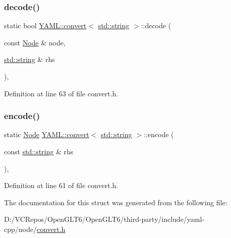 \subsubsection{\texorpdfstring{decode()}{decode()}}
{\footnotesize\ttfamily static bool \mbox{\hyperlink{struct_y_a_m_l_1_1convert}{Y\+A\+M\+L\+::convert}}$<$ \mbox{\hyperlink{glad_8h_ac83513893df92266f79a515488701770}{std\+::string}} $>$\+::decode (\begin{DoxyParamCaption}\item[{const \mbox{\hyperlink{class_y_a_m_l_1_1_node}{Node}} \&}]{node,  }\item[{\mbox{\hyperlink{glad_8h_ac83513893df92266f79a515488701770}{std\+::string}} \&}]{rhs }\end{DoxyParamCaption})\hspace{0.3cm}{\ttfamily [inline]}, {\ttfamily [static]}}



Definition at line 63 of file convert.\+h.

\mbox{\label{struct_y_a_m_l_1_1convert_3_01std_1_1string_01_4_aa0d976f9df2bb843d7ac7bcda30ac4c3}} 
\subsubsection{\texorpdfstring{encode()}{encode()}}
{\footnotesize\ttfamily static \mbox{\hyperlink{class_y_a_m_l_1_1_node}{Node}} \mbox{\hyperlink{struct_y_a_m_l_1_1convert}{Y\+A\+M\+L\+::convert}}$<$ \mbox{\hyperlink{glad_8h_ac83513893df92266f79a515488701770}{std\+::string}} $>$\+::encode (\begin{DoxyParamCaption}\item[{const \mbox{\hyperlink{glad_8h_ac83513893df92266f79a515488701770}{std\+::string}} \&}]{rhs }\end{DoxyParamCaption})\hspace{0.3cm}{\ttfamily [inline]}, {\ttfamily [static]}}



Definition at line 61 of file convert.\+h.



The documentation for this struct was generated from the following file\+:\begin{DoxyCompactItemize}
\item 
D\+:/\+V\+C\+Repos/\+Open\+G\+L\+T6/\+Open\+G\+L\+T6/third-\/party/include/yaml-\/cpp/node/\mbox{\hyperlink{convert_8h}{convert.\+h}}\end{DoxyCompactItemize}
